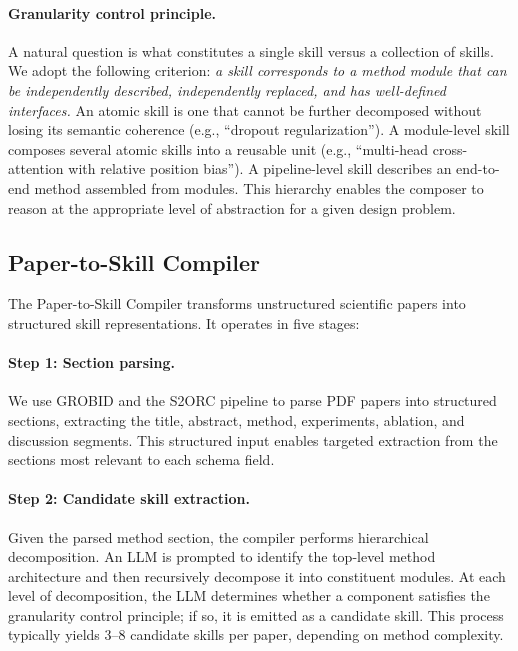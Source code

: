 \paragraph{Granularity control principle.} A natural question is what constitutes a single skill versus a collection of skills. We adopt the following criterion: \emph{a skill corresponds to a method module that can be independently described, independently replaced, and has well-defined interfaces.} An atomic skill is one that cannot be further decomposed without losing its semantic coherence (e.g., ``dropout regularization''). A module-level skill composes several atomic skills into a reusable unit (e.g., ``multi-head cross-attention with relative position bias''). A pipeline-level skill describes an end-to-end method assembled from modules. This hierarchy enables the composer to reason at the appropriate level of abstraction for a given design problem.

\subsection{Paper-to-Skill Compiler}
\label{sec:compiler}

The Paper-to-Skill Compiler transforms unstructured scientific papers into structured skill representations. It operates in five stages:

\paragraph{Step 1: Section parsing.} We use GROBID and the S2ORC pipeline to parse PDF papers into structured sections, extracting the title, abstract, method, experiments, ablation, and discussion segments. This structured input enables targeted extraction from the sections most relevant to each schema field.

\paragraph{Step 2: Candidate skill extraction.} Given the parsed method section, the compiler performs hierarchical decomposition. An LLM is prompted to identify the top-level method architecture and then recursively decompose it into constituent modules. At each level of decomposition, the LLM determines whether a component satisfies the granularity control principle; if so, it is emitted as a candidate skill. This process typically yields 3--8 candidate skills per paper, depending on method complexity.

